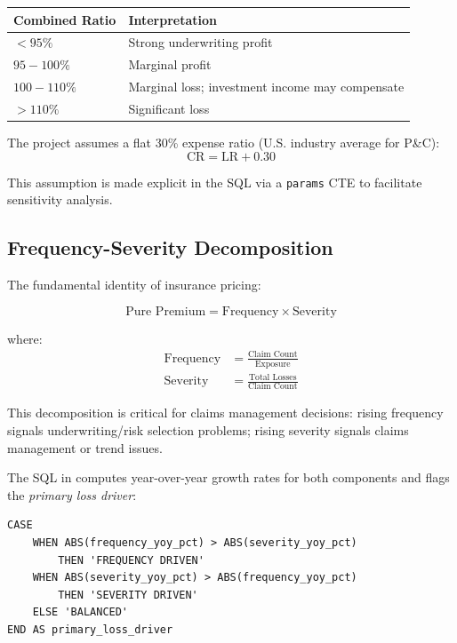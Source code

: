 \begin{center}
\begin{tabular}{ll}
\toprule
\textbf{Combined Ratio} & \textbf{Interpretation} \\
\midrule
$< 95\%$   & Strong underwriting profit \\
$95-100\%$ & Marginal profit \\
$100-110\%$ & Marginal loss; investment income may compensate \\
$> 110\%$  & Significant loss \\
\bottomrule
\end{tabular}
\end{center}

The project assumes a flat 30\% expense ratio (U.S. industry average for P\&C):
\begin{equation}
  \mathrm{CR} = \mathrm{LR} + 0.30
  \label{eq:combined-ratio-assumed}
\end{equation}

This assumption is made explicit in the SQL via a \texttt{params} CTE
to facilitate sensitivity analysis.

\subsection{Frequency-Severity Decomposition}

The fundamental identity of insurance pricing:

\begin{equation}
  \text{Pure Premium} = \text{Frequency} \times \text{Severity}
  \label{eq:pure-premium}
\end{equation}

where:
\begin{align}
  \text{Frequency} &= \frac{\text{Claim Count}}{\text{Exposure}}
  \label{eq:frequency} \\
  \text{Severity}  &= \frac{\text{Total Losses}}{\text{Claim Count}}
  \label{eq:severity}
\end{align}

This decomposition is critical for claims management decisions:
rising frequency signals underwriting/risk selection problems;
rising severity signals claims management or trend issues.

The SQL in  computes year-over-year
growth rates for both components and flags the \emph{primary loss driver}:

\begin{lstlisting}[style=sql, caption={Loss driver identification (\texttt{03\_frequency\_severity.sql})}]
CASE
    WHEN ABS(frequency_yoy_pct) > ABS(severity_yoy_pct)
        THEN 'FREQUENCY DRIVEN'
    WHEN ABS(severity_yoy_pct) > ABS(frequency_yoy_pct)
        THEN 'SEVERITY DRIVEN'
    ELSE 'BALANCED'
END AS primary_loss_driver
\end{lstlisting}

